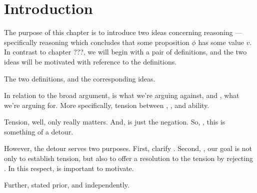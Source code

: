 \chapter{Introduction}
\label{cha:reasoning-introduction}

\begin{note}
  The purpose of this chapter is to introduce two ideas concerning reasoning --- specifically reasoning which concludes that some proposition \(\phi\) has some value \(v\).
  In contrast to {\color{red} chapter ???}, we will begin with a pair of definitions, and the two ideas will be motivated with reference to the definitions.
\end{note}

\begin{note}
  {
    \color{red}
    The two definitions, and the corresponding ideas.
  }
\end{note}

\begin{note}
  In relation to the broad argument, \ESU{} is what we're arguing against, and \EAS{}, what we're arguing for.
  More specifically, tension between \ideaCS{}, \ESU{}, and ability.
\end{note}

\begin{note}
  Tension, well, only \ESU{} really matters.
  And, \EAS{} is just the negation.
  So, \adB{}, this is something of a detour.

  However, the detour serves two purposes.
  First, clarify \ESU{}.
  Second, \EAS{}, our goal is not only to establish tension, but also to offer a resolution to the tension by rejecting \ESU{}.
  In this respect, \adB{} is important to motivate.

  Further, stated prior, and independently.
\end{note}

